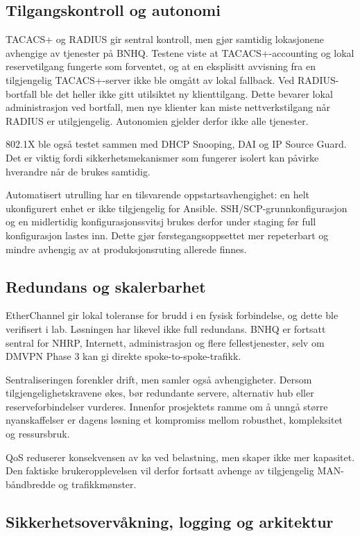 \subsection{Tilgangskontroll og autonomi}

TACACS+ og RADIUS gir sentral kontroll, men gjør samtidig lokasjonene avhengige av tjenester på BNHQ. Testene viste at TACACS+-accounting og lokal reservetilgang fungerte som forventet, og at en eksplisitt avvisning fra en tilgjengelig TACACS+-server ikke ble omgått av lokal fallback. Ved RADIUS-bortfall ble det heller ikke gitt utilsiktet ny klienttilgang. Dette bevarer lokal administrasjon ved bortfall, men nye klienter kan miste nettverkstilgang når RADIUS er utilgjengelig. Autonomien gjelder derfor ikke alle tjenester.

802.1X ble også testet sammen med DHCP Snooping, DAI og IP Source Guard. Det er viktig fordi sikkerhetsmekanismer som fungerer isolert kan påvirke hverandre når de brukes samtidig.

Automatisert utrulling har en tilsvarende oppstartsavhengighet: en helt ukonfigurert enhet er ikke tilgjengelig for Ansible. SSH/SCP-grunnkonfigurasjon og en midlertidig konfigurasjonssvitsj brukes derfor under staging før full konfigurasjon lastes inn. Dette gjør førstegangsoppsettet mer repeterbart og mindre avhengig av at produksjonsruting allerede finnes.

\subsection{Redundans og skalerbarhet}

EtherChannel gir lokal toleranse for brudd i en fysisk forbindelse, og dette ble verifisert i lab. Løsningen har likevel ikke full redundans. BNHQ er fortsatt sentral for NHRP, Internett, administrasjon og flere fellestjenester, selv om DMVPN Phase 3 kan gi direkte spoke-to-spoke-trafikk.

Sentraliseringen forenkler drift, men samler også avhengigheter. Dersom tilgjengelighetskravene økes, bør redundante servere, alternativ hub eller reserveforbindelser vurderes. Innenfor prosjektets ramme om å unngå større nyanskaffelser er dagens løsning et kompromiss mellom robusthet, kompleksitet og ressursbruk.

QoS reduserer konsekvensen av kø ved belastning, men skaper ikke mer kapasitet. Den faktiske brukeropplevelsen vil derfor fortsatt avhenge av tilgjengelig MAN-båndbredde og trafikkmønster.

\subsection{Sikkerhetsovervåkning, logging og arkitektur}

